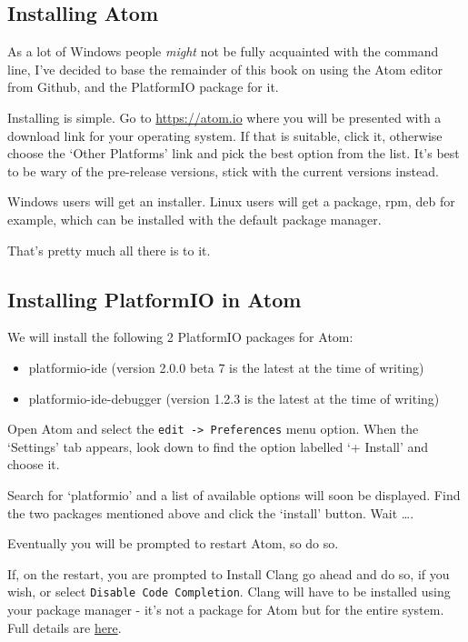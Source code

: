 \subsection{Installing Atom}\label{installing-atom}

As a lot of Windows people \emph{might} not be fully acquainted with the command
line, I've decided to base the remainder of this book on using the Atom editor
from Github, and the PlatformIO package for it. 

Installing is simple. Go to \href{https://atom.io}{https://atom.io} where you will be presented with a download link for your operating system. If that is suitable, click it, otherwise choose the `Other Platforms' link and pick the best option from the list. It's best to be wary of the pre-release versions, stick with the current versions instead.

Windows users will get an installer. Linux users will get a package, rpm, deb for example, which can be installed with the default package manager.

That's pretty much all there is to it.

\subsection{Installing PlatformIO in
Atom}\label{installing-platformio-in-atom}

We will install the following 2 PlatformIO packages for Atom:

\begin{itemize}
\item
  platformio-ide (version 2.0.0 beta 7 is the latest at the time of
  writing)
\item
  platformio-ide-debugger (version 1.2.3 is the latest at the time of
  writing)
\end{itemize}

Open Atom and select the \lstinline!edit -> Preferences! menu option.
When the `Settings' tab appears, look down to find the option labelled
`+ Install' and choose it.

Search for `platformio' and a list of available options will soon be
displayed. Find the two packages mentioned above and click the `install'
button. Wait \ldots{}.

Eventually you will be prompted to restart Atom, so do so.

If, on the restart, you are prompted to Install Clang go ahead and do
so, if you wish, or select \lstinline!Disable Code Completion!. Clang
will have to be installed using your package manager - it's not a
package for Atom but for the entire system. Full details are
\href{http://docs.platformio.org/en/latest/ide/atom.html\#ii-clang-for-intelligent-code-completion}{here}.

